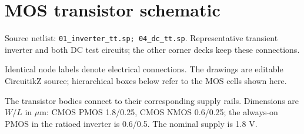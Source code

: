 \clearpage\section{MOS transistor schematic}
\begingroup\small
Source netlist: \texttt{01\_inverter\_tt.sp; 04\_dc\_tt.sp}. Representative transient inverter and both DC test circuits; the other corner decks keep these connections.

Identical node labels denote electrical connections. The drawings are editable CircuitikZ source; hierarchical boxes below refer to the MOS cells shown here.

The transistor bodies connect to their corresponding supply rails. Dimensions are \(W/L\) in \(\mu\mathrm m\): CMOS PMOS 1.8/0.25, CMOS NMOS 0.6/0.25; the always-on PMOS in the ratioed inverter is 0.6/0.5. The nominal supply is 1.8 V.

